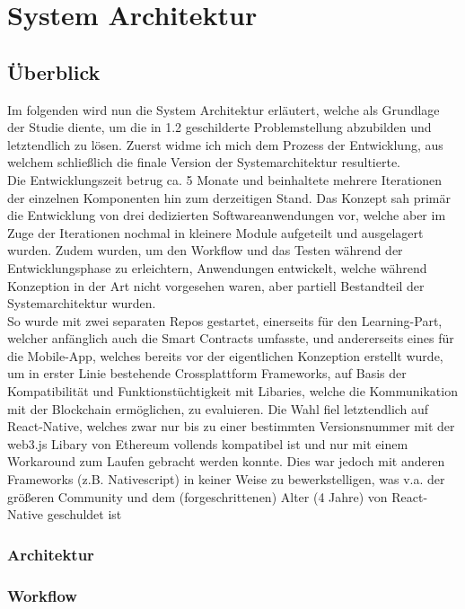 \chapter{System Architektur}
\label{kap:Kapitel03}

\section{Überblick}
Im folgenden wird nun die System Architektur erläutert, welche als Grundlage der
Studie diente, um die in 1.2 geschilderte Problemstellung abzubilden und
letztendlich zu lösen. Zuerst widme ich mich dem Prozess der Entwicklung, aus
welchem schließlich die finale Version der Systemarchitektur resultierte. \\
Die Entwicklungszeit betrug ca. 5 Monate und beinhaltete mehrere Iterationen der
einzelnen Komponenten hin zum derzeitigen Stand. Das Konzept sah primär die
Entwicklung von drei dedizierten Softwareanwendungen vor, welche aber im Zuge
der Iterationen nochmal in kleinere Module aufgeteilt und ausgelagert wurden.
Zudem wurden, um den Workflow und das Testen während der Entwicklungsphase zu
erleichtern, Anwendungen entwickelt, welche während Konzeption in der Art nicht
vorgesehen waren, aber partiell Bestandteil der Systemarchitektur wurden. \\
So wurde mit zwei separaten Repos gestartet, einerseits für den Learning-Part,
welcher anfänglich auch die Smart Contracts umfasste, und andererseits eines für
die Mobile-App, welches bereits vor der eigentlichen Konzeption erstellt wurde,
um in erster Linie bestehende Crossplattform Frameworks, auf Basis der
Kompatibilität und Funktionstüchtigkeit mit Libaries, welche die Kommunikation
mit der Blockchain ermöglichen, zu evaluieren. Die Wahl fiel letztendlich auf
React-Native, welches zwar nur bis zu einer bestimmten Versionsnummer mit der
web3.js Libary von Ethereum vollends kompatibel ist und nur mit einem
Workaround zum Laufen gebracht werden konnte. Dies war jedoch mit anderen
Frameworks (z.B. Nativescript) in keiner Weise zu bewerkstelligen, was v.a. der
größeren Community und dem (forgeschrittenen) Alter (4 Jahre) von React-Native
geschuldet ist \\
\subsection{Architektur}
\subsection{Workflow}





